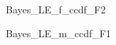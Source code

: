 \documentclass[a4j,11pt,mc, twocolumn]{jreport}
\begin{document}
	\begin{figure}[h!]
		\begin{center}
				\caption{Bayes\_LE\_f\_ccdf\_F2}
		\end{center}
	\end{figure}



	\begin{figure}[h!]
		\begin{center}
				\caption{Bayes\_LE\_m\_ccdf\_F1}
		\end{center}
	\end{figure}
\end{document}
